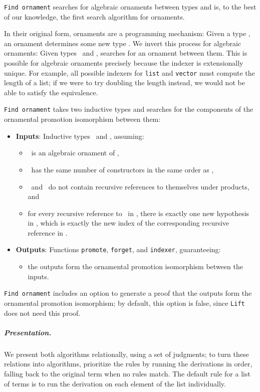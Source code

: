 \lstinline{Find ornament} searches for algebraic ornaments between types and is, to the best of our knowledge, the first search algorithm
for ornaments.

In their original form, ornaments are a programming mechanism: Given a type \Aa, an ornament determines
some new type \B. We invert this process for algebraic ornaments: Given types \Aa\ and \B, 
\toolnameb searches for an ornament between them. This is possible for algebraic ornaments precisely because the indexer is extensionally unique.
For example, all possible indexers for \lstinline{list} and \lstinline{vector} must compute
the length of a list; if we were to try doubling the length instead, we would not be able to satisfy the equivalence.

\lstinline{Find ornament} takes two inductive types and searches for the components of the 
ornamental promotion isomorphism between them:

\begin{itemize}
\item \textbf{Inputs}: Inductive types \Aa\ and \B, assuming:
\begin{itemize}
\item \B\ is an algebraic ornament of \Aa,
\item \B\ has the same number of constructors in the same order as \Aa,
\item \Aa\ and \B\ do not contain recursive references to themselves under products, and
\item for every recursive reference to \Aa\ in \Aa, there is exactly one new hypothesis in \B, which is exactly the new index of the corresponding recursive reference in \B.
\end{itemize}
\item \textbf{Outputs}: Functions \lstinline{promote}, \lstinline{forget}, and \lstinline{indexer}, guaranteeing:
\begin{itemize}
\item the outputs form the ornamental promotion isomorphism between the inputs.
\end{itemize}
\end{itemize}

\lstinline{Find ornament} includes an option to generate a proof that the outputs form the ornamental promotion isomorphism;
by default, this option is false, since \lstinline{Lift} does not need this proof.


\subparagraph*{Presentation.} We present both algorithms relationally, using a set of judgments;
to turn these relations into algorithms, prioritize the rules by running the derivations in
order, falling back to the original term when no rules match.
The default rule for a list of terms is to run the derivation on each element of the list individually. 

